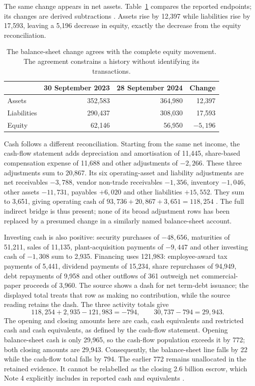 The same change appears in net assets. Table~\ref{tab:apple-statement-join}
compares the reported endpoints; its changes are derived subtractions
\citep[printed p.~31]{apple2024}. Assets rise by 12,397 while liabilities
rise by 17,593, leaving a 5,196 decrease in equity, exactly the decrease
from the equity reconciliation.

\begin{table}[htbp]
\centering
\begin{tabular}{lrrr}
\toprule &30 September 2023&28 September 2024&Change\\\midrule
Assets&352,583&364,980&12,397\\
Liabilities&290,437&308,030&17,593\\
Equity&62,146&56,950&$-5{,}196$\\\bottomrule
\end{tabular}
\caption{The balance-sheet change agrees with the complete equity movement.
The agreement constrains a history without identifying its transactions.}
\label{tab:apple-statement-join}
\end{table}

Cash follows a different reconciliation. Starting from the same net income,
the cash-flow statement adds depreciation and amortisation of 11,445,
share-based compensation expense of 11,688 and other adjustments of
$-2{,}266$. These three adjustments sum to 20,867. Its six operating-asset
and liability adjustments are net receivables $-3{,}788$, vendor non-trade
receivables $-1{,}356$, inventory $-1{,}046$, other assets $-11{,}731$,
payables $+6{,}020$ and other liabilities $+15{,}552$. They sum to 3,651,
giving operating cash of $93{,}736+20{,}867+3{,}651=118{,}254$
\citep[printed p.~33]{apple2024}. The full indirect bridge is thus present;
none of its broad adjustment rows has been replaced by a presumed change in
a similarly named balance-sheet account.

Investing cash is also positive: security purchases of $-48{,}656$,
maturities of 51,211, sales of 11,135, plant-acquisition payments of
$-9{,}447$ and other investing cash of $-1{,}308$ sum to 2,935. Financing
uses 121,983: employee-award tax payments of 5,441, dividend payments of
15,234, share repurchases of 94,949, debt repayments of 9,958 and other
outflows of 361 outweigh net commercial-paper proceeds of 3,960. The source
shows a dash for net term-debt issuance; the displayed total treats that row
as making no contribution, while the source reading retains the dash.
The three activity totals give
\[
118{,}254+2{,}935-121{,}983=-794,
\qquad 30{,}737-794=29{,}943.
\]
The opening and closing amounts here are cash, cash equivalents and restricted
cash and cash equivalents, as defined by the cash-flow statement. Opening
balance-sheet cash is only 29,965, so the cash-flow population exceeds it by
772; both closing amounts are 29,943. Consequently, the balance-sheet line
falls by 22 while the cash-flow total falls by 794. The earlier 772 remains
unallocated in the retained evidence. It cannot be relabelled as the closing
2.6 billion escrow, which Note 4 explicitly includes in reported cash and
equivalents \citep[printed p.~33 and Note 4, printed p.~37]{apple2024}.

